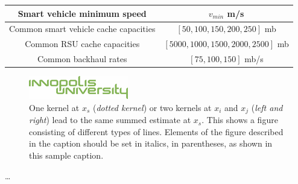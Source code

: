 \begin{longtable}{c|c}
    \hline
    Smart vehicle minimum speed           & $v_{min}$ m/s                                                                        \\
    \hline
    Common smart vehicle cache capacities & $[50, 100, 150, 200, 250]$ mb                                                        \\
    \hline
    Common RSU cache capacities           & $[5000,1000,1500,2000,2500]$ mb                                                      \\
    \hline
    Common backhaul rates                 & $[75, 100, 150]$ mb/s                                                                \\
    \hline
\end{longtable}

\begin{figure}[hbt]
    \centering
    \includegraphics[]{figs/inno.png}
    \caption{One kernel at $x_s$ (\emph{dotted kernel}) or two kernels at
        $x_i$ and $x_j$ (\textit{left and right}) lead to the same summed estimate
        at $x_s$. This shows a figure consisting of different types of
        lines. Elements of the figure described in the caption should be set in
        italics, in parentheses, as shown in this sample caption.}
    \label{fig:thiex}
\end{figure}


\ldots